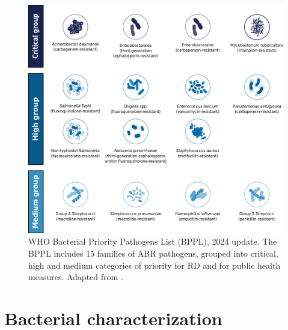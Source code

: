 \begin{figure}[!ht]
    \centering
    \includegraphics[angle=0,width=\textwidth]{figures/introduction/Figure2.pdf}
    \caption[\ac{WHO} Bacterial Priority Pathogens List, 2024 update]{WHO Bacterial Priority Pathogens List (BPPL), 2024 update. The \ac{BPPL} includes 15 families of \ac{ABR} pathogens, grouped into critical, high and medium categories of priority for \ac{RD} and for public health measures. Adapted from \cite{noauthor_who_2024}.}
    \label{fig:introduction_figure2}
\end{figure}

\section{Bacterial characterization}

